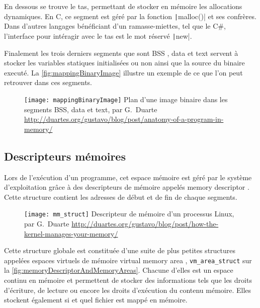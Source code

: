 En dessous se trouve le tas, permettant de stocker en mémoire les allocations dynamiques. En C, ce segment est géré par la fonction \texttt|malloc()| et ses confrères. Dans d'autres langages bénéficiant d'un ramasse-miettes, tel que le C\#, l'interface pour intéragir avec le tas est le mot réservé \texttt|new|.

Finalement les trois derniers segments que sont \og BSS \fg, \og data \fg et \og text \fg servent à stocker les variables statiques initialisées ou non ainsi que la source du binaire executé. La \autoref{fig:mappingBinaryImage} illustre un exemple de ce que l'on peut retrouver dans ces segments.

\begin{figure}[H]
	\centering
	\texttt{[image: mappingBinaryImage]}
	{Plan d'une image binaire dans les segments BSS, data et text, par G.~Duarte}
	{\url{http://duartes.org/gustavo/blog/post/anatomy-of-a-program-in-memory/}}
	\label{fig:mappingBinaryImage}
\end{figure}

\subsection{Descripteurs mémoires}

Lors de l'exécution d'un programme, cet espace mémoire est géré par le système d'exploitation grâce à des descripteurs de mémoire appelés \og memory descriptor \fg. Cette structure contient les adresses de début et de fin de chaque segments.

\begin{figure}[H]
	\centering
	\texttt{[image: mm\_struct]}
	{Descripteur de mémoire d'un processus Linux, par G.~Duarte}
	{\url{http://duartes.org/gustavo/blog/post/how-the-kernel-manages-your-memory/}}
	\label{fig:mm_struct}
\end{figure}

Cette structure globale est constituée d'une suite de plus petites structures appelées espaces virtuels de mémoire \og virtual memory area \fg, \texttt{vm_area_struct} sur la \autoref{fig:memoryDescriptorAndMemoryAreas}. Chacune d'elles est un espace continu en mémoire et permettent de stocker des informations tels que les droits d'écriture, de lecture ou encore les droits d'exécution du contenu mémoire. Elles stockent également si et quel fichier est mappé en mémoire.

